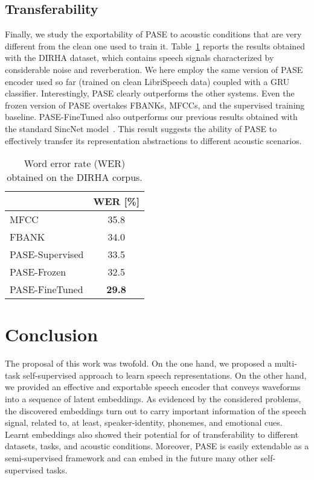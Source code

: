 \documentclass[a4paper]{article}
\begin{document}
\subsection{Transferability}
\label{sec:res_transfer}

Finally, we study the exportability of PASE to acoustic conditions that are very different from the clean one used to train it. Table~\ref{tab:dirha} reports the results obtained with the DIRHA dataset, which contains speech signals characterized by considerable noise and reverberation. We here employ the same version of PASE encoder used so far (trained on clean LibriSpeech data) coupled with a GRU classifier.
Interestingly, PASE clearly outperforms the other systems. Even the frozen version of PASE overtakes FBANKs, MFCCs, and the supervised training baseline. PASE-FineTuned also outperforms our previous results obtained with the standard SincNet model~\cite{sincnet_irasl}. This result suggests the ability of PASE to effectively transfer its representation abstractions to different acoustic scenarios. 

\begin{table}[t]
\centering
\caption{Word error rate (WER) obtained on the DIRHA corpus.}
\label{tab:dirha}
\setlength{\tabcolsep}{10pt}
\begin{tabular}{l|c}
    \hline 
            & WER [\%] \\
     \hline
     MFCC  & 35.8  \\
     FBANK  & 34.0  \\
     PASE-Supervised  & 33.5 \\ 
     \hline
     PASE-Frozen & 32.5 \\
     PASE-FineTuned & \textbf{29.8} \\

     \hline
\end{tabular}
\end{table}



\section{Conclusion} 
\label{sec:conc}
The proposal of this work was twofold. On the one hand, we proposed a multi-task self-supervised approach to learn speech representations. On the other hand, we provided an effective and exportable speech encoder that conveys waveforms into a sequence of latent embeddings. As evidenced by the considered problems, the discovered embeddings turn out to carry important information of the speech signal, related to, at least, speaker-identity, phonemes, and emotional cues. Learnt embeddings also showed their potential for of transferability to different datasets, tasks, and acoustic conditions.
Moreover, PASE is easily extendable as a semi-supervised framework and can embed in the future many other self-supervised tasks.
\end{document}
